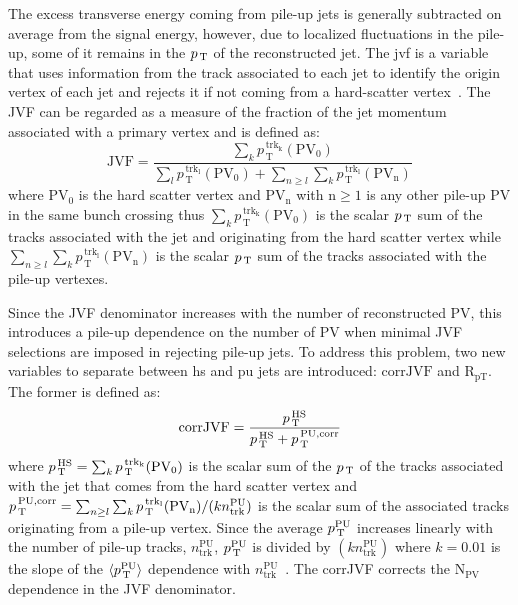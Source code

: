 The excess transverse energy coming from pile-up jets is generally subtracted on
average from the signal energy, however, due to localized fluctuations in the
pile-up, some of it remains in the $p_\mathrm{\, T}$ of the reconstructed jet. The \gls{jvf}
is a variable that uses information from the track associated to each jet to
identify the origin vertex of each jet and rejects it if not coming from a
hard-scatter vertex~\cite{JVF}. The JVF can be regarded as a measure of the
fraction of the jet momentum associated with a primary vertex and is defined as:
\begin{equation}
  \label{eq:91}
  \mathrm{JVF} = \frac{\sum_k p_\mathrm{\, T}^\mathrm{\, trk_k}
    (\mathrm{PV_0})}{\sum_l p_\mathrm{\, T}^\mathrm{\, trk_l} (\mathrm{PV_0}) +
    \sum_{n \geq l} \sum_k p_\mathrm{\, T}^\mathrm{\, trk_l} (\mathrm{PV_n})}
\end{equation}
where PV$_0$ is the hard scatter vertex and PV$_\mathrm{n}$ with
$\mathrm{n} \geq 1$ is any other pile-up PV in the same bunch crossing thus
$\sum_k p_\mathrm{\, T}^\mathrm{\, trk_k} (\mathrm{PV_0})$ is the scalar $p_\mathrm{\, T}$
sum of the tracks associated with the jet and originating from the hard scatter
vertex while
$\sum_{n \geq l} \sum_k p_\mathrm{\, T}^\mathrm{\, trk_l} (\mathrm{PV_n})$ is
the scalar $p_\mathrm{\, T}$ sum of the tracks associated with the pile-up vertexes.

Since the JVF denominator increases with the number of reconstructed PV, this
introduces a pile-up dependence on the number of PV when minimal JVF selections
are imposed in rejecting pile-up jets. To address this problem, two new
variables to separate between \gls{hs} and \gls{pu} jets are introduced:
$\mathrm{corrJVF}$ and $\mathrm{R_{pT}}$. The former is defined as:
\begin{equation}
  \label{eq:92}
  \mathrm{corrJVF} = \frac{p_\mathrm{\, T}^{\mathrm{\, HS}}}{p_\mathrm{\, T}^{\, \mathrm{HS}} +
    p_\mathrm{\, T}^{\, \mathrm{PU, corr}}}
\end{equation}
where
$p_\mathrm{\, T}^{\mathrm{\, HS}} = \sum_k p_\mathrm{\, T}^\mathrm{\, trk_k}
(\mathrm{PV_0})$
is the scalar sum of the $p_\mathrm{\, T}$ of the tracks associated with the jet that comes
from the hard scatter vertex and
$p_\mathrm{\, T}^{\, \mathrm{PU, corr}} = \sum_{n \geq l} \sum_k p_\mathrm{\, T}^\mathrm{\,
  trk_l} (\mathrm{PV_n}) / (k n_{\mathrm{trk}}^{\mathrm{PU}})$
is the scalar sum of the associated tracks originating from a pile-up
vertex. Since the average $p_\mathrm{\, T}^{\mathrm{PU}}$ increases linearly with the number
of pile-up tracks, $n_{\mathrm{trk}}^{\mathrm{PU}}$, $p_\mathrm{\, T}^{\mathrm{PU}}$ is
divided by $(kn_{\mathrm{trk}}^{\mathrm{PU}})$ where $k = 0.01$ is the slope of
the $\langle p_\mathrm{\, T}^{\mathrm{PU}} \rangle$ dependence with
$n_{\mathrm{trk}}^{\mathrm{PU}}$~\cite{JVT}. The corrJVF corrects the
N$_\mathrm{PV}$ dependence in the JVF denominator.

